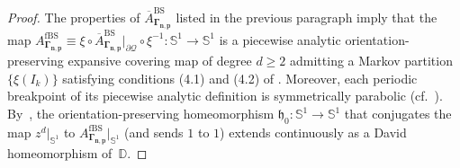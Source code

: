 \documentclass[10pt,a4paper]{amsart}
\newcommand{\cf}{cf.\ }
\theoremstyle{definition}
\theoremstyle{remark}
\newcommand{\D}{\mathbb{D}}
\begin{document}
\begin{proof}
The properties of $\overline{A}_{\pmb{\Gamma_{n,p}}}^{\mathrm{BS}}$ listed in the previous paragraph imply that the map $A_{\pmb{\Gamma_{n,p}}}^{\mathrm{fBS}}\equiv \xi\circ \overline{A}_{\pmb{\Gamma_{n,p}}}^{\mathrm{BS}}\vert_{\partial\mathcal{Q}}\circ\xi^{-1}:\mathbb{S}^1\to\mathbb{S}^1$ is a piecewise analytic orientation-preserving expansive covering map of degree $d\geq2$ admitting a Markov partition $\{\xi(I_k)\}$ satisfying conditions (4.1) and (4.2) of \cite[Th.\,4.12]{LMMN}. Moreover, each periodic breakpoint of its piecewise analytic definition is symmetrically parabolic (\cf \cite[Def.\,4.6, Rem.\,4.7]{LMMN}). By~\cite[Th.\,4.12]{LMMN}, the orientation-preserving homeomorphism $\mathfrak{h}_0:\mathbb{S}^1\to\mathbb{S}^1$ that conjugates the map $z^d\vert_{\mathbb{S}^1}$ to $A_{\pmb{\Gamma_{n,p}}}^{\mathrm{fBS}}\vert_{\mathbb{S}^1}$ (and sends $1$ to $1$) extends continuously as a David homeomorphism of~$\D$.
\end{proof}
\end{document}
